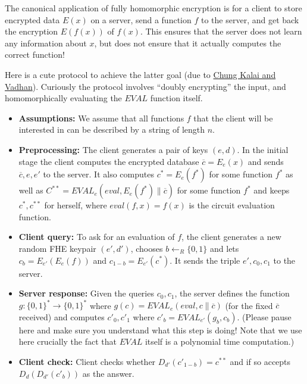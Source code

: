 The canonical application of fully homomorphic encryption is for a
client to store encrypted data \(E(x)\) on a server, send a function
\(f\) to the server, and get back the encryption \(E(f(x))\) of
\(f(x)\). This ensures that the server does not learn any information
about \(x\), but does not ensure that it actually computes the correct
function!

Here is a cute protocol to achieve the latter goal (due to
\href{https://eprint.iacr.org/2010/241}{Chung Kalai and Vadhan}).
Curiously the protocol involves ``doubly encrypting'' the input, and
homomorphically evaluating the \(\ensuremath{\mathit{EVAL}}\) function
itself.

\begin{itemize}
\item
  \textbf{Assumptions:} We assume that all functions \(f\) that the
  client will be interested in can be described by a string of length
  \(n\).
\item
  \textbf{Preprocessing:} The client generates a pair of keys \((e,d)\).
  In the initial stage the client computes the encrypted database
  \(\overline{c}=E_e(x)\) and sends \(\overline{c},e,e'\) to the server.
  It also computes \(c^* = E_e(f^*)\) for some function \(f^*\) as well
  as
  \(C^{**}=\ensuremath{\mathit{EVAL}}_{e}(eval,E_e(f^*)\|\overline{c})\)
  for some function \(f^*\) and keeps \(c^*,c^{**}\) for herself, where
  \(eval(f,x)=f(x)\) is the circuit evaluation function.
\item
  \textbf{Client query:} To ask for an evaluation of \(f\), the client
  generates a new random FHE keypair \((e',d')\), chooses
  \(b \leftarrow_R \{0,1\}\) and lets \(c_b = E_{e'}(E_e(f))\) and
  \(c_{1-b}=E_{e'}(c^*)\). It sends the triple \(e',c_0,c_1\) to the
  server.
\item
  \textbf{Server response:} Given the queries \(c_0,c_1\), the server
  defines the function \(g:\{0,1\}^* \rightarrow \{0,1\}^*\) where
  \(g(c)=\ensuremath{\mathit{EVAL}}_e(eval,c\|\overline{c})\) (for the
  fixed \(\overline{c}\) received) and computes \(c'_0,c'_1\) where
  \(c'_b = \ensuremath{\mathit{EVAL}}_{e'}(g_b,c_b)\). (Please pause
  here and make sure you understand what this step is doing! Note that
  we use here crucially the fact that \(\ensuremath{\mathit{EVAL}}\)
  itself is a polynomial time computation.)
\item
  \textbf{Client check:} Client checks whether
  \(D_{d'}(c'_{1-b})=c^{**}\) and if so accepts \(D_d(D_{d'}(c'_b))\) as
  the answer.
\end{itemize}

